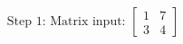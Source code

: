 \documentclass[preview]{standalone}
\begin{document}
\begin{align*}
\text{Step 1: Matrix input: } \begin{bmatrix} 1 & 7 \\ 3 & 4 \end{bmatrix}
\end{align*}
\end{document}
